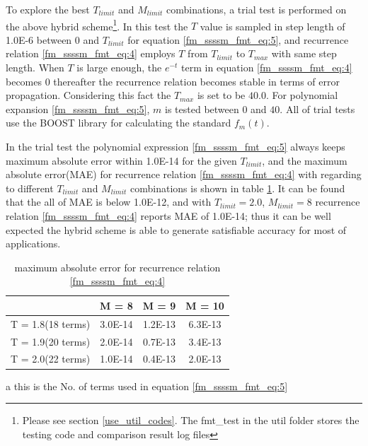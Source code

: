 To explore the best $T_{limit}$ and $M_{limit}$ combinations, a trial test is performed on
the above hybrid scheme\footnote{Please see section \ref{use_util_codes}. The fmt\_test
in the util folder stores the testing code and comparison result log files}. 
In this test the $T$ value is sampled in step length of 1.0E-6
between $0$ and $T_{limit}$ for equation \ref{fm_ssssm_fmt_eq:5}, and recurrence relation 
\ref{fm_ssssm_fmt_eq:4} employs $T$ from $T_{limit}$ to $T_{max}$ with same step length.
When $T$ is large enough, the $e^{-t}$ term in equation \ref{fm_ssssm_fmt_eq:4} 
becomes 0 thereafter the recurrence relation becomes stable in terms of error propagation.
Considering this fact the $T_{max}$ is set to be $40.0$. For polynomial expansion 
\ref{fm_ssssm_fmt_eq:5}, $m$ is tested between $0$ and $40$. All of trial tests use 
the BOOST library for calculating the standard $f_{m}(t)$.

In the trial test the polynomial expression \ref{fm_ssssm_fmt_eq:5} 
always keeps maximum absolute error within 1.0E-14 for the given $T_{limit}$, and the 
maximum absolute error(MAE) for recurrence relation \ref{fm_ssssm_fmt_eq:4} with regarding to 
different $T_{limit}$ and $M_{limit}$ combinations is shown in table \ref{table:1}. 
It can be found that the all of MAE is below 1.0E-12, and 
with $T_{limit}=2.0$, $M_{limit}=8$ recurrence relation \ref{fm_ssssm_fmt_eq:4} reports
MAE of 1.0E-14; thus it can be well expected the hybrid scheme is able to generate satisfiable
accuracy for most of applications.

\begin{table}
\caption{maximum absolute error for recurrence relation \ref{fm_ssssm_fmt_eq:4}}
\label{table:1}
\begin{center}
\begin{threeparttable}
\begin{tabular}{c|c|c|c}
\hline
                    &       M = 8         &      M = 9        &   M = 10          \\
\hline
T = 1.8(18 terms)\tnote{a}   
                    &       3.0E-14       &      1.2E-13      &   6.3E-13         \\
\hline
T = 1.9(20 terms)   &       2.0E-14       &      0.7E-13      &   3.4E-13         \\
\hline
T = 2.0(22 terms)   &       1.0E-14       &      0.4E-13      &   2.0E-13         \\
\hline
\end{tabular}
\begin{tablenotes}
    \item[a] this is the No. of terms used in equation \ref{fm_ssssm_fmt_eq:5}
\end{tablenotes}
\end{threeparttable}
\end{center}
\end{table} 




